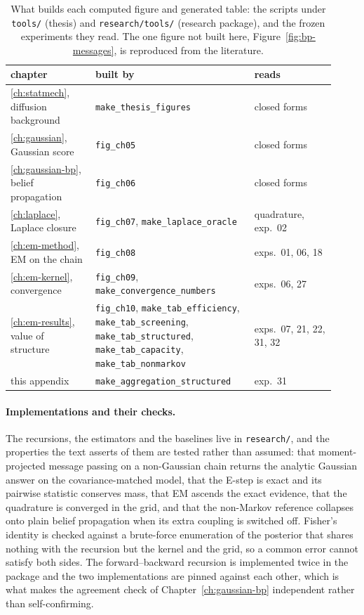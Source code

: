 \begin{table}[tbp]\small\centering
\caption[Figure-to-code map]{What builds each computed figure and generated
table: the scripts under \texttt{tools/} (thesis) and \texttt{research/tools/}
(research package), and the frozen experiments they read. The one figure not
built here, Figure~\ref{fig:bp-messages}, is reproduced from the literature.}
\label{tab:figure-map}
\setlength{\tabcolsep}{5pt}
\begin{tabular}{@{}>{\raggedright\arraybackslash}p{0.24\linewidth}%
                 >{\raggedright\arraybackslash}p{0.45\linewidth}%
                 >{\raggedright\arraybackslash}p{0.23\linewidth}@{}}
\toprule
chapter & built by & reads \\
\midrule
\ref{ch:statmech}, diffusion background & \texttt{make\_thesis\_figures} & closed forms \\
\ref{ch:gaussian}, Gaussian score & \texttt{fig\_ch05} & closed forms \\
\ref{ch:gaussian-bp}, belief propagation & \texttt{fig\_ch06} & closed forms \\
\ref{ch:laplace}, Laplace closure & \texttt{fig\_ch07}, \texttt{make\_laplace\_oracle} & quadrature, exp.~02 \\
\ref{ch:em-method}, EM on the chain & \texttt{fig\_ch08} & exps.~01, 06, 18 \\
\ref{ch:em-kernel}, convergence & \texttt{fig\_ch09}, \texttt{make\_convergence\_numbers} & exps.~06, 27 \\
\ref{ch:em-results}, value of structure & \texttt{fig\_ch10}, \texttt{make\_tab\_efficiency}, \texttt{make\_tab\_screening}, \texttt{make\_tab\_structured}, \texttt{make\_tab\_capacity}, \texttt{make\_tab\_nonmarkov} & exps.~07, 21, 22, 31, 32 \\
this appendix & \texttt{make\_aggregation\_structured} & exp.~31 \\
\bottomrule
\end{tabular}
\end{table}

\paragraph{Implementations and their checks.}
The recursions, the estimators and the baselines live in \texttt{research/},
and the properties the text asserts of them are tested rather than assumed:
that moment-projected message passing on a non-Gaussian chain returns the
analytic Gaussian answer on the covariance-matched model, that the E-step is
exact and its pairwise statistic conserves mass, that EM ascends the exact
evidence, that the quadrature is converged in the grid, and that the
non-Markov reference collapses onto plain belief propagation when its extra
coupling is switched off. Fisher's identity is checked against a brute-force
enumeration of the posterior that shares nothing with the recursion but the
kernel and the grid, so a common error cannot satisfy both sides. The
forward--backward recursion is implemented twice in the package and the two
implementations are pinned against each other, which is what makes the
agreement check of Chapter~\ref{ch:gaussian-bp} independent rather than
self-confirming.


